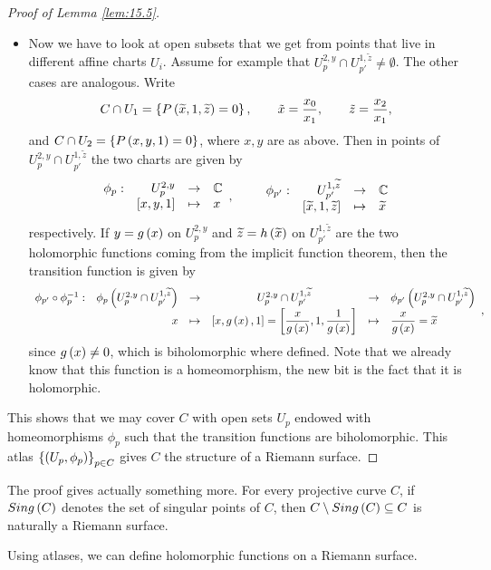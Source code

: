 \begin{proof}[Proof of Lemma \ref{lem:15.5}]
\begin{itemize}
\item Now we have to look at open subsets that we get from points that live in different affine charts $ U_i $. Assume for example that $ U_p^{2, y} \cap U_{p'}^{1, \widetilde{z}} \ne \emptyset $. The other cases are analogous. Write
$$ C \cap U_1 = \left\{ P\left( \widetilde{x}, 1, \widetilde{z} \right) = 0 \right\}, \qquad \tilde{x} = \dfrac{x_0}{x_1}, \qquad \tilde{z} = \dfrac{x_2}{x_1}, $$
and $ C \cap U_2 = \left\{ P\left( x, y, 1 \right) = 0 \right\} $, where $ x, y $ are as above. Then in points of $ U_p^{2, y} \cap U_{p'}^{1, \widetilde{z}} $ the two charts are given by
$$ \function[\phi_p]{U_p^{2, y}}{\C}{\sb{x, y, 1}}{x}, \qquad \function[\phi_{p'}]{U_{p'}^{1, \widetilde{z}}}{\C}{\sb{\widetilde{x}, 1, \widetilde{z}}}{\widetilde{x}} $$
respectively. If $ y = g\left( x \right) $ on $ U_p^{2, y} $ and $ \widetilde{z} = h\left( \widetilde{x} \right) $ on $ U_{p'}^{1, \widetilde{z}} $ are the two holomorphic functions coming from the implicit function theorem, then the transition function is given by
$$
\begin{array}{crcccl}
\phi_{p'} \circ \phi_p^{-1} : & \phi_p\left( U_p^{2, y} \cap U_{p'}^{1, \widetilde{z}} \right) & \to & U_p^{2, y} \cap U_{p'}^{1, \widetilde{z}} & \to & \phi_{p'}\left( U_p^{2, y} \cap U_{p'}^{1, \widetilde{z}} \right) \\
& x & \mapsto & \left[ x, g\left( x \right), 1 \right] = \left[ \dfrac{x}{g\left( x \right)}, 1, \dfrac{1}{g\left( x \right)} \right] & \mapsto & \dfrac{x}{g\left( x \right)} = \widetilde{x}
\end{array},
$$
since $ g\left( x \right) \ne 0 $, which is biholomorphic where defined. Note that we already know that this function is a homeomorphism, the new bit is the fact that it is holomorphic.
\end{itemize}
This shows that we may cover $ C $ with open sets $ U_p $ endowed with homeomorphisms $ \phi_p $ such that the transition functions are biholomorphic. This atlas $ \left\{ \left( U_p, \phi_p \right) \right\}_{p \in C} $ gives $ C $ the structure of a Riemann surface.
\end{proof}


\begin{remark}
The proof gives actually something more. For every projective curve $ C $, if $ Sing\left( C \right) $ denotes the set of singular points of $ C $, then $ C \setminus Sing\left( C \right) \subseteq C $ is naturally a Riemann surface.
\end{remark}

Using atlases, we can define holomorphic functions on a Riemann surface.

